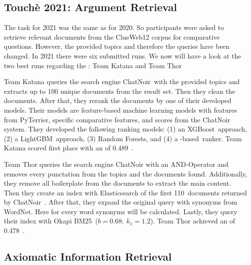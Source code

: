 \subsection{Touchè 2021: Argument Retrieval}

The task for 2021 was the same as for 2020.
So participants were asked to retrieve relevant documents from the ClueWeb12 corpus for comparative questions.
However, the provided topics and therefore the queries have been changed.
In 2021 there were six submitted runs.
We now will have a look at the two best runs regarding the : Team Katana and Team Thor~\cite{BondarenkoFBGAPBSWPH2021}

Team Katana queries the search engine ChatNoir~\todocite with the provided topics and extracts up to 100 unique documents from the result set.
Then they clean the documents. 
After that, they rerank the documents by one of their developed models.
Their models are feature-based machine learning models with features from PyTerrier, specific comparative features, and scores from the ChatNoir system. They developed the following ranking models:
(1) an XGBoost~\todocite approach, (2) a LightGBM~\todocite approach, (3) Random Forests, and (4) a \Bert-based~\todocite ranker.
Team Katana scored first place with an  of 0.489~\cite{ChekalinaP2021}.

Team Thor queries the search engine ChatNoir with an AND-Operator and removes every punctation from the topics and the documents found.
Additionally, they remove all boilerplate from the documents to extract the main content.
Then they create an index with Elasticsearch of the first 110~documents returned by ChatNoir~\todocite.
After that, they expand the original query with synonyms from WordNet.
Here for every word synonyms will be calculated.
Lastly, they query their index with Okapi BM25~(\( b = 0.68;~k_1 = 1.2 \)).
Team Thor achieved an  of 0.478~\cite{ShirshakovaW2021}.

\subsection{Axiomatic Information Retrieval}

